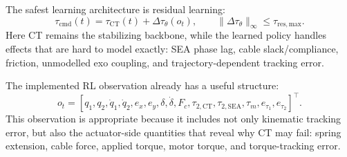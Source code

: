 \documentclass[11pt]{article}
\begin{document}
The safest learning architecture is residual learning:
\begin{equation}
    \tau_{\mathrm{cmd}}(t)
    = \tau_{\mathrm{CT}}(t) + \Delta\tau_\theta(o_t),
    \qquad
    \|\Delta\tau_\theta\|_\infty \leq \tau_{\mathrm{res,max}} .
\end{equation}
Here CT remains the stabilizing backbone, while the learned policy handles effects that are hard to model exactly: SEA phase lag, cable slack/compliance, friction, unmodelled exo coupling, and trajectory-dependent tracking error.

The implemented RL observation already has a useful structure:
\begin{equation}
    o_t = [q_1,q_2,\dot{q}_1,\dot{q}_2,e_x,e_y,\delta,\dot{\delta},F_c,
           \tau_{2,\mathrm{CT}},\tau_{2,\mathrm{SEA}},\tau_m,
           e_{\tau_1},e_{\tau_2}]^\top .
\end{equation}
This observation is appropriate because it includes not only kinematic tracking error, but also the actuator-side quantities that reveal why CT may fail: spring extension, cable force, applied torque, motor torque, and torque-tracking error.
\end{document}
